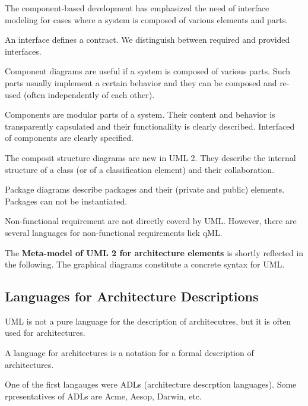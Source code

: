 The component-based development has emphasized the need of interface modeling for 
cases where a system is composed of various elements and parts.

\begin{definition}[Interface]
An interface defines a contract.
We distinguish between required and provided interfaces.
\end{definition}


Component diagrams are useful if a system is composed of various parts. Such parts usually implement
a certain behavior and they can be composed and re-used (often independently of each other).

\begin{definition}[Component]
Components are modular parts of a system. Their content and behavior is transparently
capsulated and their functionalilty is clearly described.
Interfaced of components are clearly specified.
\end{definition}

The composit structure diagrams are new in UML 2. They describe the internal
structure of a class (or of a classification element) and their collaboration.

Package diagrams describe packages and their (private and public) elements. Packages
can not be instantiated.

Non-functional requirement are not directly coverd by UML.
However, there are several languages for non-functional requirements
liek qML.


The \textbf{Meta-model of UML 2 for architecture elements} is shortly reflected in the following.
The graphical diagrams constitute a concrete syntax for UML.

\subsection{Languages for Architecture Descriptions}

UML is not a pure language for the description of architecutres, but it is often used for architectures.

\begin{definition}
A language for architectures is a notation for a formal description of architectures.
\end{definition}

One of the first langauges were ADLs (architecture descrption languages).
Some rpresentatives of ADLs are Acme, Aesop, Darwin, etc.

